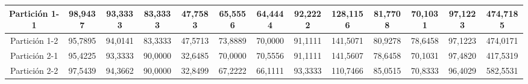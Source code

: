 \documentclass[12pt]{article}
\begin{document}
\begin{table}[H]
{\begin{tabular}{|c|cccc|cccc|cccc|}
Partición 1-1 & \multicolumn{1}{c|}{98,9437}                                                  & \multicolumn{1}{c|}{93,3333}                                                 & \multicolumn{1}{c|}{83,3333} & 47,7583 & \multicolumn{1}{c|}{65,5556}                                                  & \multicolumn{1}{c|}{64,4444}                                                 & \multicolumn{1}{c|}{92,2222} & 128,1156 & \multicolumn{1}{c|}{81,7708}                                                  & \multicolumn{1}{c|}{70,1031}                                                 & \multicolumn{1}{c|}{97,1223} & 474,7185 \\ \hline
Partición 1-2 & \multicolumn{1}{c|}{95,7895}                                                  & \multicolumn{1}{c|}{94,0141}                                                 & \multicolumn{1}{c|}{83,3333} & 47,5713 & \multicolumn{1}{c|}{73,8889}                                                  & \multicolumn{1}{c|}{70,0000}                                                 & \multicolumn{1}{c|}{91,1111} & 141,5071 & \multicolumn{1}{c|}{80,9278}                                                  & \multicolumn{1}{c|}{78,6458}                                                 & \multicolumn{1}{c|}{97,1223} & 474,0171 \\ \hline
Partición 2-1 & \multicolumn{1}{c|}{95,4225}                                                  & \multicolumn{1}{c|}{93,3333}                                                 & \multicolumn{1}{c|}{90,0000} & 32,6485 & \multicolumn{1}{c|}{70,0000}                                                  & \multicolumn{1}{c|}{70,5556}                                                 & \multicolumn{1}{c|}{91,1111} & 141,5607 & \multicolumn{1}{c|}{78,6458}                                                  & \multicolumn{1}{c|}{70,1031}                                                 & \multicolumn{1}{c|}{97,4820} & 417,5319 \\ \hline
Partición 2-2 & \multicolumn{1}{c|}{97,5439}                                                  & \multicolumn{1}{c|}{94,3662}                                                 & \multicolumn{1}{c|}{90,0000} & 32,8499 & \multicolumn{1}{c|}{67,2222}                                                  & \multicolumn{1}{c|}{66,1111}                                                 & \multicolumn{1}{c|}{93,3333} & 110,7466 & \multicolumn{1}{c|}{85,0515}                                                  & \multicolumn{1}{c|}{70,8333}                                                 & \multicolumn{1}{c|}{96,4029} & 582,5531 \\ \hline

\end{tabular}}
\end{table}
\end{document}

